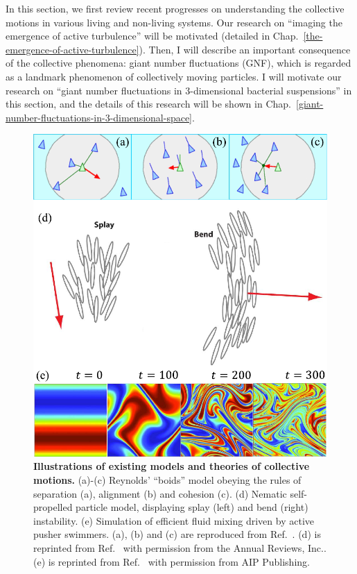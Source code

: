 In this section, we first review recent progresses on understanding the collective motions in various living and non-living systems. Our research on ``imaging the emergence of active turbulence'' will be motivated
(detailed in Chap.~\ref{the-emergence-of-active-turbulence}). Then, I will describe an important consequence of the collective phenomena: giant number fluctuations (GNF), which is regarded as a landmark phenomenon of collectively moving particles. I will motivate our research on ``giant number fluctuations in 3-dimensional bacterial suspensions'' in this section, and the details of this research will be shown in Chap.~\ref{giant-number-fluctuations-in-3-dimensional-space}.

\begin{figure}[!htbp]
	\begin{center}
	\includegraphics[width=5.5 in]{Figs/1-Intro/4.pdf}
	\end{center}
	\caption[Illustrations of Existing Models and Theories of Collective Motions]
	{
	\textbf{Illustrations of existing models and theories of collective motions.}
	(a)-(c) Reynolds’ “boids” model obeying the rules of separation (a), alignment (b) and cohesion (c).
	(d) Nematic self-propelled particle model, displaying splay (left) and bend (right) instability.
	(e) Simulation of efficient fluid mixing driven by active pusher swimmers.
	(a), (b) and (c) are reproduced from Ref.~\cite{Reynolds1987}.
	(d) is reprinted from Ref.~\cite{Ramaswamy2010} with permission from the Annual Reviews, Inc..
	(e) is reprinted from Ref.~\cite{Saintillan2008b} with permission from AIP Publishing.
	}
	\label{fig:models-of-collective-motions}
\end{figure}

